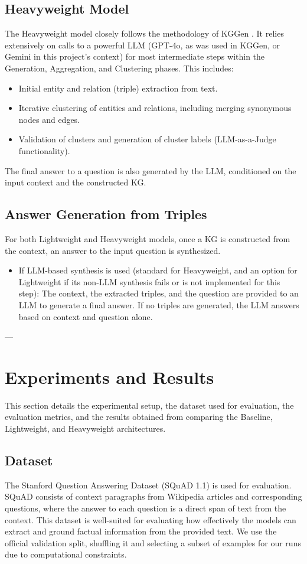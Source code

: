 \documentclass{article}
\begin{document}
\subsection{Heavyweight Model}
The Heavyweight model closely follows the methodology of KGGen \citep{KGGen_Arxiv_2025}. It relies extensively on calls to a powerful LLM (GPT-4o, as was used in KGGen, or Gemini in this project's context) for most intermediate steps within the Generation, Aggregation, and Clustering phases. This includes:
\begin{itemize}[noitemsep,topsep=0pt]
    \item Initial entity and relation (triple) extraction from text.
    \item Iterative clustering of entities and relations, including merging synonymous nodes and edges.
    \item Validation of clusters and generation of cluster labels (LLM-as-a-Judge functionality).
\end{itemize}
The final answer to a question is also generated by the LLM, conditioned on the input context and the constructed KG.

\subsection{Answer Generation from Triples}
For both Lightweight and Heavyweight models, once a KG is constructed from the context, an answer to the input question is synthesized.
\begin{itemize}[noitemsep,topsep=0pt]
    \item If LLM-based synthesis is used (standard for Heavyweight, and an option for Lightweight if its non-LLM synthesis fails or is not implemented for this step): The context, the extracted triples, and the question are provided to an LLM to generate a final answer. If no triples are generated, the LLM answers based on context and question alone.
\end{itemize}

---
\section{Experiments and Results}
\label{sec:experiments}
This section details the experimental setup, the dataset used for evaluation, the evaluation metrics, and the results obtained from comparing the Baseline, Lightweight, and Heavyweight architectures.

\subsection{Dataset}
The Stanford Question Answering Dataset (SQuAD 1.1) \citep{rajpurkar2016squad} is used for evaluation. SQuAD consists of context paragraphs from Wikipedia articles and corresponding questions, where the answer to each question is a direct span of text from the context. This dataset is well-suited for evaluating how effectively the models can extract and ground factual information from the provided text. We use the official validation split, shuffling it and selecting a subset of examples for our runs due to computational constraints.
\end{document}
